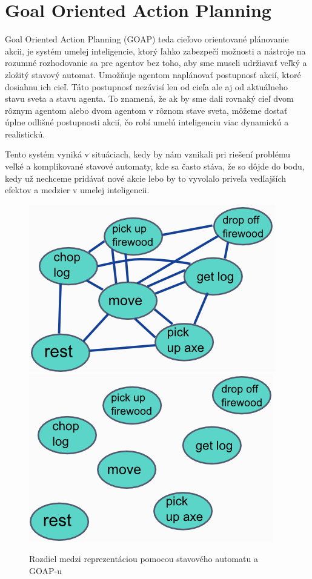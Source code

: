 \section{Goal Oriented Action Planning}
Goal Oriented Action Planning (GOAP) teda cieľovo orientované plánovanie akcii, je systém umelej inteligencie, ktorý ľahko zabezpečí možnosti a nástroje na rozumné rozhodovanie sa pre agentov bez toho, aby sme museli udržiavať veľký a zložitý stavový automat. Umožňuje agentom naplánovať postupnosť akcií, ktoré dosiahnu ich cieľ. Táto postupnosť nezávisí len od cieľa ale aj od aktuálneho stavu sveta a stavu agenta. To znamená, že ak by sme dali rovnaký cieľ dvom rôznym agentom alebo dvom agentom v rôznom stave sveta, môžeme dostať úplne odlišné postupnosti akcií, čo robí umelú inteligenciu viac dynamickú a realistickú.\par
Tento systém vyniká v situáciach, kedy by nám vznikali pri riešení problému veľké a komplikované stavové automaty, kde sa často stáva, že so dôjde do bodu, kedy už nechceme pridávať nové akcie lebo by to vyvolalo priveľa vedľajších efektov a medzier v umelej inteligencii.
\begin{figure}[H] 
\begin{center}
\includegraphics[scale=0.65]{img/fsm_states.png} \hspace{0.5cm}
\includegraphics[scale=0.65]{img/goap_states.png}
\caption{Rozdiel medzi reprezentáciou pomocou stavového automatu a GOAP-u\cite{goap}}
\label{fig:ch12}
\end{center}
\end{figure}
